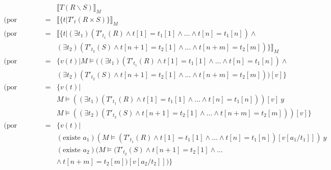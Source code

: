 \documentclass[a4paper]{article}
\newcommand{\existe}{\mbox{existe }}
\begin{document}
		\begin{eqnarray*}
			&& \llbracket T(R \backslash S)\rrbracket _M \\
			\mbox{(por traduccion)} & = & \llbracket \{t|T'_t(R \times S)\}\rrbracket _M \\
			\mbox{(por traduccion)} & = & \llbracket \{t|
				(\exists t_1)(T'_{t_1}(R) \wedge t[1]=t_1[1] \wedge \ldots \wedge t[n]=t_1[n]) \wedge\\
				&& (\exists t_2)(T'_{t_2}(S) \wedge t[n+1]=t_2[1] \wedge \ldots \wedge t[n+m]=t_2[m])\}\rrbracket _M \\
			\mbox{(por semantica)} & = & \{v(t)|M \models 
				((\exists t_1)(T'_{t_1}(R) \wedge t[1]=t_1[1] \wedge \ldots \wedge t[n]=t_1[n]) \wedge\\
				&& (\exists t_2)(T'_{t_2}(S) \wedge t[n+1]=t_2[1] \wedge \ldots \wedge t[n+m]=t_2[m]))[v]\} \\
			\mbox{(por semantica)} & = & \{v(t)|\\
				&& M \models ((\exists t_1)(T'_{t_1}(R) \wedge t[1]=t_1[1] \wedge \ldots \wedge t[n]=t_1[n]))[v] \ y \ \\
				&& M \models ((\exists t_2)(T'_{t_2}(S) \wedge t[n+1]=t_2[1] \wedge \ldots \wedge t[n+m]=t_2[m]))[v]\} \\
			\mbox{(por semantica)} & = & \{v(t)| \\
				&& (\existe a_1)(M \models (T'_{t_1}(R) \wedge t[1]=t_1[1] \wedge \ldots \wedge t[n]=t_1[n])[v[a_1/t_1]] ) \ y \ \\
				&& (\existe a_2)(M \models (T'_{t_2}(S) \wedge t[n+1]=t_2[1] \wedge \ldots \\
				&& \wedge \ t[n+m]=t_2[m])[v[a_2/t_2]] )\} 
			\end{eqnarray*}
%				
\end{document}
